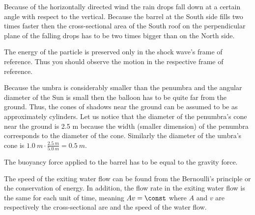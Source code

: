\documentclass[11pt]{article}
\begin{document}

\hinteng
Because of the horizontally directed wind the rain drops fall down at a certain angle with respect to the vertical. Because the barrel at the South side fills two times faster then the cross-sectional area of the South roof on the perpendicular plane of the falling drops has to be two times bigger than on the North side.
\probend
\bigskip


\hinteng
The energy of the particle is preserved only in the shock wave’s frame of reference. Thus you should observe the motion in the respective frame of reference.
\probend
\bigskip


\hinteng
Because the umbra is considerably smaller than the penumbra and the angular diameter of the Sun is small then the balloon has to be quite far from the ground. Thus, the cones of shadows near the ground can be assumed to be as approximately cylinders. Let us notice that the diameter of the penumbra’s cone near the ground is 2.5 m because the width (smaller dimension) of the penumbra corresponds to the diameter of the cone. Similarly the diameter of the umbra’s cone is $\SI{1,0}{m}\cdot\frac{\SI{2,5}{m}}{\SI{5,0}{m}} = \SI{0,5}{m}$.
\probend
\bigskip


\hinteng
The buoyancy force applied to the barrel has to be equal to the gravity force.
\probend
\bigskip


\hinteng
The speed of the exiting water flow can be found from the Bernoulli’s principle or the conservation of energy. In addition, the flow rate in the exiting water flow is the same for each unit of time, meaning $Av = \const$ where $A$ and $v$ are respectively the cross-sectional are and the speed of the water flow.
\probend
\bigskip
\end{document}
